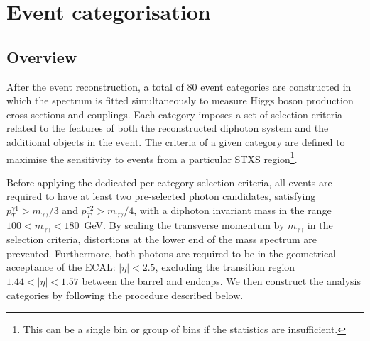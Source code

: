 \newpage
\section{Event categorisation}\label{sec:event_categorisation}

\subsection{Overview}
After the event reconstruction, a total of 80 event categories are constructed in which the \mgg spectrum is fitted simultaneously to measure Higgs boson production cross sections and couplings. Each category imposes a set of selection criteria related to the features of both the reconstructed diphoton system and the additional objects in the event. The criteria of a given category are defined to maximise the sensitivity to events from a particular STXS region\footnote{This can be a single bin or group of bins if the statistics are insufficient.}.

Before applying the dedicated per-category selection criteria, all events are required to have at least two pre-selected photon candidates, satisfying $p_T^{\gamma 1}>m_{\gamma\gamma}/3$ and ${p_T^{\gamma 2}>m_{\gamma\gamma}/4}$, with a diphoton invariant mass in the range $100<m_{\gamma\gamma}<180$~GeV. By scaling the transverse momentum by $m_{\gamma\gamma}$ in the selection criteria, distortions at the lower end of the mass spectrum are prevented. Furthermore, both photons are required to be in the geometrical acceptance of the ECAL: $|\eta|<2.5$, excluding the transition region $1.44<|\eta|<1.57$ between the barrel and endcaps. We then construct the analysis categories by following the procedure described below.

